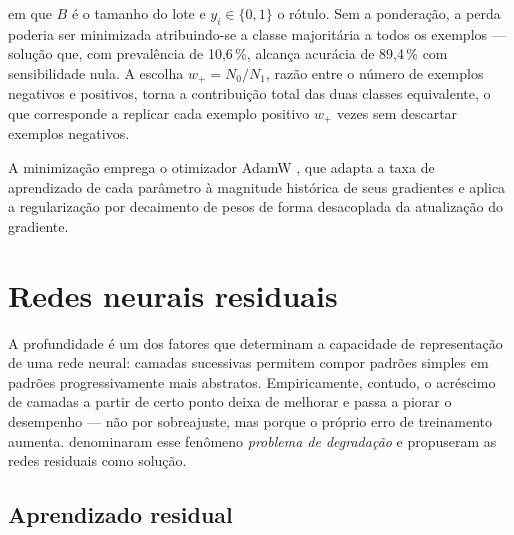 \noindent
em que $B$ é o tamanho do lote e $y_i \in \{0, 1\}$ o rótulo. Sem a
ponderação, a perda poderia ser minimizada atribuindo-se a classe
majoritária a todos os exemplos --- solução que, com prevalência de
10,6\,\%, alcança acurácia de 89,4\,\% com sensibilidade nula. A escolha
$w_{+} = N_0/N_1$, razão entre o número de exemplos negativos e positivos,
torna a contribuição total das duas classes equivalente, o que corresponde a
replicar cada exemplo positivo $w_{+}$ vezes sem descartar exemplos
negativos.

A minimização emprega o otimizador AdamW \cite{loshchilov2019decoupled}, que
adapta a taxa de aprendizado de cada parâmetro à magnitude histórica de seus
gradientes e aplica a regularização por decaimento de pesos de forma
desacoplada da atualização do gradiente.

%
%

\section{Redes neurais residuais}
\label{sec:fund-resnet}
%

A profundidade é um dos fatores que determinam a capacidade de
representação de uma rede neural: camadas sucessivas permitem compor padrões
simples em padrões progressivamente mais abstratos. Empiricamente, contudo,
o acréscimo de camadas a partir de certo ponto deixa de melhorar e passa a
piorar o desempenho --- não por sobreajuste, mas porque o próprio erro de
treinamento aumenta.  denominaram esse fenômeno
\textit{problema de degradação} e propuseram as redes residuais como
solução.

\subsection{Aprendizado residual}
\label{subsec:fund-residual}

